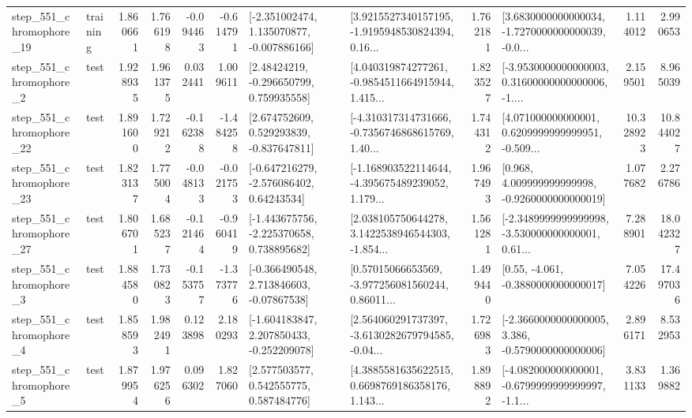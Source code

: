 \begin{tabular}{llrrrrllrlrr}
  step\_551\_chromophore\_19 &  training &      1.860661 &    1.766198 &     -0.094463 & -0.614791 &   [-2.351002474, 1.135070877, -0.007886166] &  [3.9215527340157195, -1.9195948530824394, 0.16... &       1.762181 &  [3.6830000000000034, -1.7270000000000039, -0.0... &            1.114012 &          2.990653 \\
   step\_551\_chromophore\_2 &      test &      1.928935 &    1.961375 &      0.032441 &  1.009611 &     [2.48424219, -0.296650799, 0.759935558] &  [4.040319874277261, -0.9854511664915944, 1.415... &       1.823527 &  [-3.9530000000000003, 0.31600000000000006, -1.... &            2.159501 &          8.965039 \\
  step\_551\_chromophore\_22 &      test &      1.891600 &    1.729212 &     -0.162388 & -1.484258 &    [2.674752609, 0.529293839, -0.837647811] &  [-4.310317314731666, -0.7356746868615769, 1.40... &       1.744312 &  [4.071000000000001, 0.6209999999999951, -0.509... &           10.328923 &         10.844027 \\
  step\_551\_chromophore\_23 &      test &      1.823137 &    1.775004 &     -0.048133 & -0.021753 &    [-0.647216279, -2.576086402, 0.64243534] &  [-1.168903522114644, -4.395675489239052, 1.179... &       1.967493 &    [0.968, 4.009999999999998, -0.9260000000000019] &            1.077682 &          2.276786 \\
  step\_551\_chromophore\_27 &      test &      1.806701 &    1.685237 &     -0.121464 & -0.960419 &   [-1.443675756, -2.225370658, 0.738895682] &  [2.038105750644278, 3.1422538946544303, -1.854... &       1.561281 &  [-2.3489999999999998, -3.530000000000001, 0.61... &            7.288901 &         18.042327 \\
   step\_551\_chromophore\_3 &      test &      1.884580 &    1.730823 &     -0.153757 & -1.373776 &    [-0.366490548, 2.713846603, -0.07867538] &  [0.57015066653569, -3.977256081560244, 0.86011... &       1.499440 &                [0.55, -4.061, -0.3880000000000017] &            7.054226 &         17.497036 \\
   step\_551\_chromophore\_4 &      test &      1.858593 &    1.982491 &      0.123898 &  2.180293 &   [-1.604183847, 2.207850433, -0.252209078] &  [2.564060291737397, -3.6130282679794585, -0.04... &       1.726983 &  [-2.3660000000000005, 3.386, -0.5790000000000006] &            2.896171 &          8.532953 \\
   step\_551\_chromophore\_5 &      test &      1.879954 &    1.976256 &      0.096302 &  1.827060 &     [2.577503577, 0.542555775, 0.587484776] &  [4.3885581635622515, 0.6698769186358176, 1.143... &       1.898892 &  [-4.082000000000001, -0.6799999999999997, -1.1... &            3.831133 &          1.369882 \\

\end{tabular}
